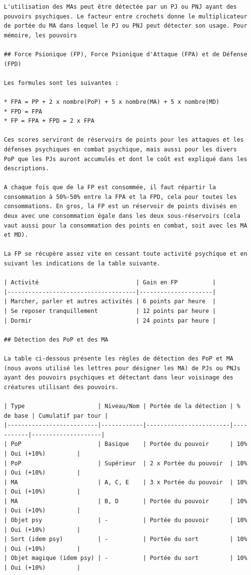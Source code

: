 \documentclass[12pt]{article}
\begin{document}
{\begin{verbatim}
L'utilisation des MAs peut être détectée par un PJ ou PNJ ayant des pouvoirs psychiques. Le facteur entre crochets donne le multiplicateur de portée du MA dans lequel le PJ ou PNJ peut détecter son usage. Pour mémoire, les pouvoirs

## Force Psionique (FP), Force Psionique d'Attaque (FPA) et de Défense (FPD)

Les formules sont les suivantes :

* FPA = PP + 2 x nombre(PoP) + 5 x nombre(MA) + 5 x nombre(MD)
* FPD = FPA
* FP = FPA + FPD = 2 x FPA

Ces scores serviront de réservoirs de points pour les attaques et les défenses psychiques en combat psychique, mais aussi pour les divers PoP que les PJs auront accumulés et dont le coût est expliqué dans les descriptions.

A chaque fois que de la FP est consommée, il faut répartir la consommation à 50%-50% entre la FPA et la FPD, cela pour toutes les consommations. En gros, la FP est un réservoir de points divisés en deux avec une consommation égale dans les deux sous-réservoirs (cela vaut aussi pour la consommation des points en combat, soit avec les MA et MD).

La FP se récupère assez vite en cessant toute activité psychique et en suivant les indications de la table suivante.

| Activité                            | Gain en FP          |
|-------------------------------------|---------------------|
| Marcher, parler et autres activités | 6 points par heure  |
| Se reposer tranquillement           | 12 points par heure |
| Dormir                              | 24 points par heure |

## Détection des PoP et des MA

La table ci-dessous présente les règles de détection des PoP et MA (nous avons utilisé les lettres pour désigner les MA) de PJs ou PNJs ayant des pouvoirs psychiques et détectant dans leur voisinage des créatures utilisant des pouvoirs.

| Type                     | Niveau/Nom | Portée de la détection | % de base | Cumulatif par tour |
|--------------------------|------------|------------------------|-----------|--------------------|
| PoP                      | Basique    | Portée du pouvoir      | 10%       | Oui (+10%)         |
| PoP                      | Supérieur  | 2 x Portée du pouvoir  | 10%       | Oui (+10%)         |
| MA                       | A, C, E    | 3 x Portée du pouvoir  | 10%       | Oui (+10%)         |
| MA                       | B, D       | Portée du pouvoir      | 10%       | Oui (+10%)         |
| Objet psy                | -          | Portée du pouvoir      | 10%       | Oui (+10%)         |
| Sort (idem psy)          | -          | Portée du sort         | 10%       | Oui (+10%)         |
| Objet magique (idem psy) | -          | Portée du sort         | 10%       | Oui (+10%)         |


\end{verbatim}}
\end{document}
